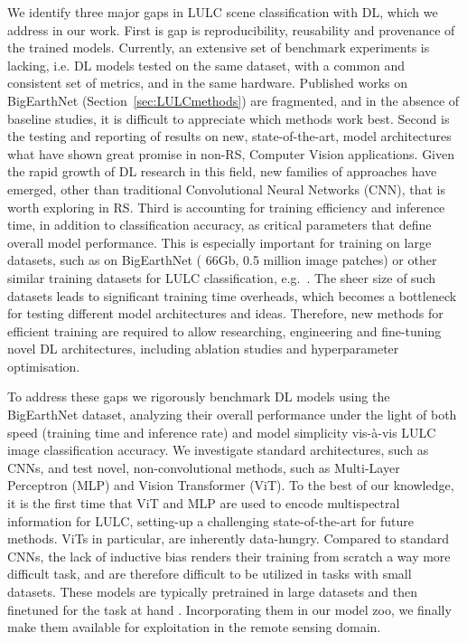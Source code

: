 \documentclass[journal]{IEEEtran}
\begin{document}
We identify three major gaps in LULC scene classification with DL, which we address in our work. 
First is gap is reproducibility, reusability and provenance of the trained models. Currently, an extensive set of benchmark experiments is lacking, i.e. DL models tested on the same dataset, with a common and consistent set of metrics, and in the same hardware. Published works on BigEarthNet (Section~\ref{sec:LULCmethods}) are fragmented, and in the absence of baseline studies, it is difficult to appreciate which methods work best.
Second is the testing and reporting of results on new, state-of-the-art, model architectures what have shown great promise in non-RS, Computer Vision applications. Given the rapid growth of DL research in this field, new families of approaches have emerged, other than traditional Convolutional Neural Networks (CNN), that is worth exploring in RS. 
Third is accounting for training efficiency and inference time, in addition to classification accuracy, as critical parameters that define overall model performance. This is especially important for training on large datasets, such as on BigEarthNet ( 66Gb,  0.5 million image patches) or other similar training datasets for LULC classification, e.g.~\cite{hong2021multimodal, helber2019eurosat}. The sheer size of such datasets leads to significant training time overheads, which becomes a bottleneck for testing different model architectures and ideas. Therefore, new methods for efficient training are required to allow researching, engineering and fine-tuning novel DL architectures, including ablation studies and hyperparameter optimisation.




To address these gaps we rigorously benchmark DL models using the BigEarthNet dataset, analyzing their overall performance under the light of both speed (training time and inference rate) and model simplicity vis-à-vis LULC image classification accuracy. We investigate standard architectures, such as CNNs, and test novel, non-convolutional methods, such as Multi-Layer Perceptron (MLP) and Vision Transformer (ViT). To the best of our knowledge, it is the first time that ViT and MLP are used to encode multispectral information for LULC, setting-up a challenging state-of-the-art for future methods. ViTs in particular, are inherently data-hungry. Compared  to standard CNNs, the lack of inductive bias renders their training from scratch a way more difficult task, and are therefore difficult to be utilized in tasks with small datasets. These models are typically pretrained in large datasets and then finetuned for the task at hand \citep{DBLP:journals/corr/abs-2010-11929, steiner2021train}. Incorporating them in our model zoo, we finally make them available for exploitation in the remote sensing domain.
\end{document}
